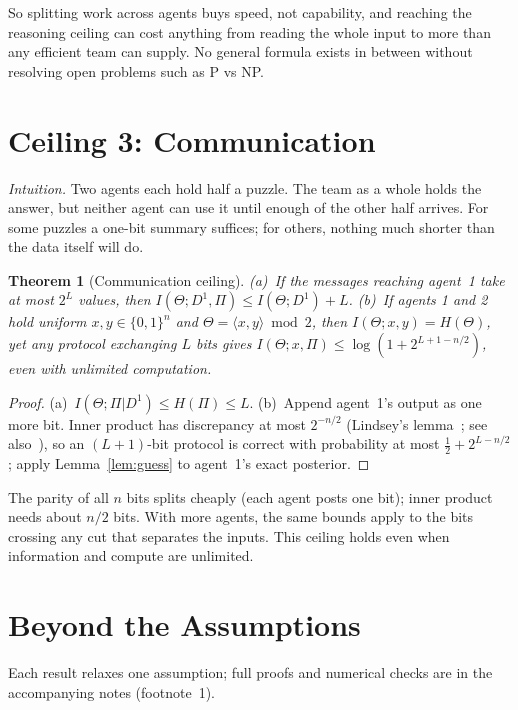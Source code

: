 \documentclass[conference]{IEEEtran}
\newtheorem{theorem}{Theorem}
\theoremstyle{definition}
\newcommand{\I}{I}
\newcommand{\Hh}{H}
\newcommand{\intuition}[1]{\noindent\textit{Intuition.} #1}
\begin{document}
\noindent So splitting work across agents buys speed, not capability, and
reaching the reasoning ceiling can cost anything from reading the whole input to
more than any efficient team can supply. No general formula exists in between
without resolving open problems such as P vs NP.

\section{Ceiling 3: Communication}\label{sec:comm}

\intuition{Two agents each hold half a puzzle. The team as a whole holds the
answer, but neither agent can use it until enough of the other half arrives.
For some puzzles a one-bit summary suffices; for others, nothing much shorter
than the data itself will do.}

\begin{theorem}[Communication ceiling]\label{thm:comm}
(a)~If the messages reaching agent~1 take at most $2^L$ values, then
$\I(\Theta;D^1,\Pi)\le\I(\Theta;D^1)+L$. (b)~If agents 1 and 2 hold uniform
$x,y\in\{0,1\}^n$ and $\Theta=\langle x,y\rangle\bmod2$, then
$\I(\Theta;x,y)=\Hh(\Theta)$, yet any protocol exchanging $L$ bits gives
$\I(\Theta;x,\Pi)\le\log(1+2^{L+1-n/2})$, even with unlimited computation.
\end{theorem}
\begin{proof}
(a)~$\I(\Theta;\Pi|D^1)\le\Hh(\Pi)\le L$. (b)~Append agent~1's output as one more
bit. Inner product has discrepancy at most $2^{-n/2}$ (Lindsey's
lemma~\cite{kushilevitz1997}; see also~\cite{chor1988}), so an $(L{+}1)$-bit protocol is correct
with probability at most $\frac12+2^{L-n/2}$; apply Lemma~\ref{lem:guess} to
agent~1's exact posterior.
\end{proof}

\noindent The parity of all $n$ bits splits cheaply (each agent posts one bit); inner product needs
about $n/2$ bits. With more agents, the same bounds apply to the bits crossing
any cut that separates the inputs. This ceiling holds even when information and compute are
unlimited.

\section{Beyond the Assumptions}\label{sec:ext}

Each result relaxes one assumption; full proofs and numerical checks are in the
accompanying notes (footnote~1).
\end{document}
